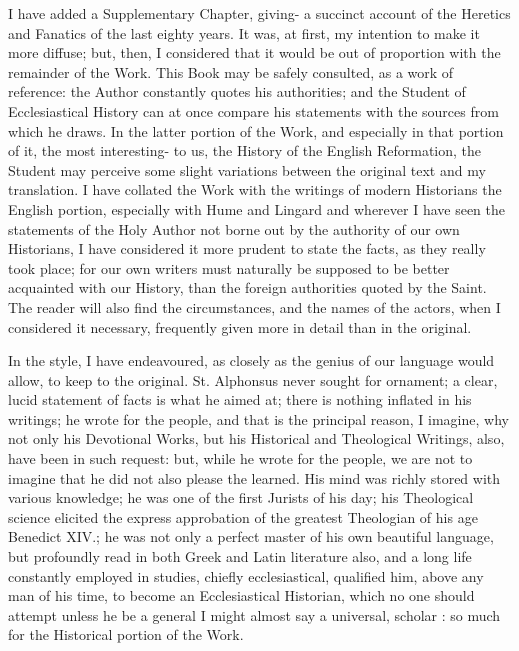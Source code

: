 \documentclass[12pt]{book}
\begin{document}
I have added a Supplementary Chapter, giving- a succinct account of the Heretics and Fanatics of the last
eighty years. It was, at first, my intention to make it more diffuse; but, then, I considered that it would be
out of proportion with the remainder of the Work. This Book may be safely consulted, as a work of
reference: the Author constantly quotes his authorities; and the Student of Ecclesiastical History can at
once compare his statements with the sources from which he draws. In the latter portion of the Work, and
especially in that portion of it, the most interesting- to us, the History of the English Reformation, the
Student may perceive some slight variations between the original text and my translation. I have collated
the Work with the writings of modern Historians the English portion, especially with Hume and Lingard
and wherever I have seen the statements of the Holy Author not borne out by the authority of our own
Historians, I have considered it more prudent to state the facts, as they really took place; for our own
writers must naturally be supposed to be better acquainted with our History, than the foreign authorities
quoted by the Saint. The reader will also find the circumstances, and the names of the actors, when I
considered it necessary, frequently given more in detail than in the original.

In the style, I have endeavoured, as closely as the genius of our language would allow, to keep to the
original. St. Alphonsus never sought for ornament; a clear, lucid statement of facts is what he aimed at;
there is nothing inflated in his writings; he wrote for the people, and that is the principal reason, I
imagine, why not only his Devotional Works, but his Historical and Theological Writings, also, have been
in such request: but, while he wrote for the people, we are not to imagine that he did not also please the
learned. His mind was richly stored with various knowledge; he was one of the first Jurists of his day; his
Theological science elicited the express approbation of the greatest Theologian of his age Benedict XIV.;
he was not only a perfect master of his own beautiful language, but profoundly read in both Greek and
Latin literature also, and a long life constantly employed in studies, chiefly ecclesiastical, qualified him,
above any man of his time, to become an Ecclesiastical Historian, which no one should attempt unless he
be a general I might almost say a universal, scholar : so much for the Historical portion of the Work.
\end{document}
